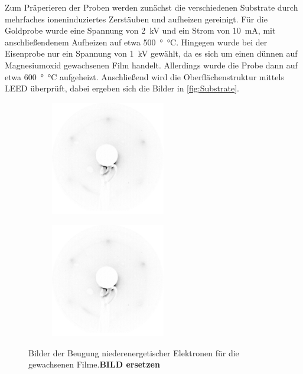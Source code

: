         Zum Präperieren der Proben werden zunächst die verschiedenen Substrate durch mehrfaches ioneninduziertes Zerstäuben und aufheizen gereinigt.
        Für die Goldprobe wurde eine Spannung von \SI{2}{\kilo\volt} und ein Strom von \SI{10}{\milli\ampere}, mit anschließendenem Aufheizen auf etwa \SI{500}{\degree\celsius}.
        Hingegen wurde bei der Eisenprobe nur ein Spannung von \SI{1}{\kilo\volt} gewählt, da es sich um einen dünnen auf Magnesiumoxid gewachsenen Film handelt.
        Allerdings wurde die Probe dann auf etwa \SI{600}{\degree\celsius} aufgeheizt.
        Anschließend wird die Oberflächenstruktur mittels LEED überprüft, dabei ergeben sich die Bilder in \autoref{fig:Substrate}.

        \begin{figure}
            \centering
            \begin{subfigure}{0.48\textwidth}
                \centering
                \includegraphics[height=5cm]{./content/pictures/2021_06_15_019_NiO(111)_73eV_Thicklayer}
            \end{subfigure}
            \begin{subfigure}{0.48\textwidth}
                \centering
                \includegraphics[height=5cm]{./content/pictures/2021_06_15_019_NiO(111)_73eV_Thicklayer}
            \end{subfigure}
            \caption{Bilder der Beugung niederenergetischer Elektronen für die gewachsenen Filme.\textbf{BILD ersetzen}}
        \label{fig:Filme}
        \end{figure}
